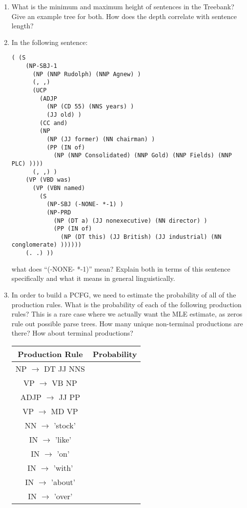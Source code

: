 \documentclass[11pt,twoside]{article}
\begin{document}
\begin{enumerate}
\item What is the minimum and maximum height of sentences in the Treebank?  Give an example tree for both.  How does the depth correlate with sentence length?
\item In the following sentence:
\begin{verbatim}
( (S 
    (NP-SBJ-1 
      (NP (NNP Rudolph) (NNP Agnew) )
      (, ,) 
      (UCP 
        (ADJP 
          (NP (CD 55) (NNS years) )
          (JJ old) )
        (CC and) 
        (NP 
          (NP (JJ former) (NN chairman) )
          (PP (IN of) 
            (NP (NNP Consolidated) (NNP Gold) (NNP Fields) (NNP PLC) ))))
      (, ,) )
    (VP (VBD was) 
      (VP (VBN named) 
        (S 
          (NP-SBJ (-NONE- *-1) )
          (NP-PRD 
            (NP (DT a) (JJ nonexecutive) (NN director) )
            (PP (IN of) 
              (NP (DT this) (JJ British) (JJ industrial) (NN conglomerate) ))))))
    (. .) ))
\end{verbatim}
what does ``(-NONE- *-1)'' mean?  Explain both in terms of this sentence specifically and what it means in general linguistically.

\item In order to build a PCFG, we need to estimate the probability of all of the production rules.  What is the probability of each of the following production rules?  This is a rare case where we actually want the MLE estimate, as zeros rule out possible parse trees.  How many unique non-terminal productions are there?  How about terminal productions?
\begin{center}
\begin{tabular}{c|c}
Production Rule & Probability \\
\hline
NP $\rightarrow$ DT JJ NNS & \\
VP $\rightarrow$ VB NP & \\
ADJP $\rightarrow$ JJ PP & \\
VP $\rightarrow$ MD VP & \\
NN $\rightarrow$ 'stock' & \\
IN $\rightarrow$ 'like' & \\
IN $\rightarrow$ 'on' & \\
IN $\rightarrow$ 'with' & \\
IN $\rightarrow$ 'about' & \\
IN $\rightarrow$ 'over' & \\
\end{tabular}
\end{center}


\end{enumerate}
\end{document}
